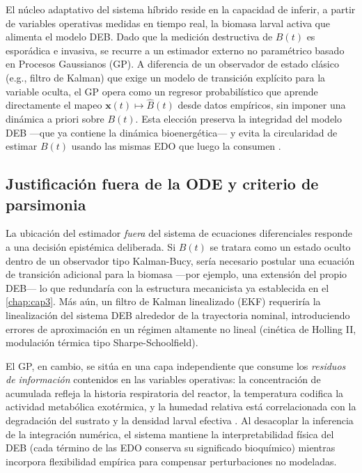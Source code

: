 El núcleo adaptativo del sistema híbrido reside en la capacidad de inferir, a partir de variables operativas medidas en tiempo real, la biomasa larval activa que alimenta el modelo DEB. Dado que la medición destructiva de $B(t)$ es esporádica e invasiva, se recurre a un estimador externo no paramétrico basado en Procesos Gaussianos (GP). A diferencia de un observador de estado clásico (e.g., filtro de Kalman) que exige un modelo de transición explícito para la variable oculta, el GP opera como un regresor probabilístico que aprende directamente el mapeo $\mathbf{x}(t) \mapsto \hat{B}(t)$ desde datos empíricos, sin imponer una dinámica a priori sobre $B(t)$. Esta elección preserva la integridad del modelo DEB —que ya contiene la dinámica bioenergética— y evita la circularidad de estimar $B(t)$ usando las mismas EDO que luego la consumen \parencite{raissiPhysicsinformedNeuralNetworks2019, weichertReviewMachineLearning2019}.

\subsection{Justificación fuera de la ODE y criterio de parsimonia}
\label{subsec:cap4_gp_justificacion}

La ubicación del estimador \emph{fuera} del sistema de ecuaciones diferenciales responde a una decisión epistémica deliberada. Si $B(t)$ se tratara como un estado oculto dentro de un observador tipo Kalman-Bucy, sería necesario postular una ecuación de transición adicional para la biomasa —por ejemplo, una extensión del propio DEB— lo que redundaría con la estructura mecanicista ya establecida en el \cref{chap:cap3}. Más aún, un filtro de Kalman linealizado (EKF) requeriría la linealización del sistema DEB alrededor de la trayectoria nominal, introduciendo errores de aproximación en un régimen altamente no lineal (cinética de Holling II, modulación térmica tipo Sharpe-Schoolfield).

El GP, en cambio, se sitúa en una capa independiente que consume los \emph{residuos de información} contenidos en las variables operativas: la concentración de  acumulada refleja la historia respiratoria del reactor, la temperatura codifica la actividad metabólica exotérmica, y la humedad relativa está correlacionada con la degradación del sustrato y la densidad larval efectiva \parencite{rossiEstimatingDynamicsGreenhouse2024}. Al desacoplar la inferencia de la integración numérica, el sistema mantiene la interpretabilidad física del DEB (cada término de las EDO conserva su significado bioquímico) mientras incorpora flexibilidad empírica para compensar perturbaciones no modeladas.

